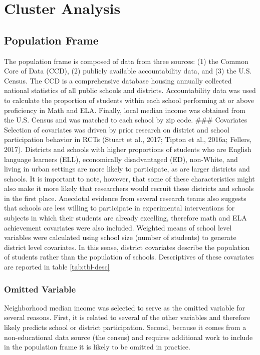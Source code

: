 \documentclass[man]{apa6}
\theoremstyle{definition}
\theoremstyle{definition}
\theoremstyle{definition}
\theoremstyle{remark}
\begin{document}
\section{Cluster Analysis}\label{cluster-analysis}

\subsection{Population Frame}\label{population-frame}

The population frame is composed of data from three sources: (1) the
Common Core of Data (CCD), (2) publicly available accountability data,
and (3) the U.S. Census. The CCD is a comprehensive database housing
annually collected national statistics of all public schools and
districts. Accountability data was used to calculate the proportion of
students within each school performing at or above proficiency in Math
and ELA. Finally, local median income was obtained from the U.S. Census
and was matched to each school by zip code. \#\#\# Covariates Selection
of covariates was driven by prior research on district and school
participation behavior in RCTs (Stuart et al., 2017; Tipton et al.,
2016a; Fellers, 2017). Districts and schools with higher proportions of
students who are English language learners (ELL), economically
disadvantaged (ED), non-White, and living in urban settings are more
likely to participate, as are larger districts and schools. It is
important to note, however, that some of these characteristics might
also make it more likely that researchers would recruit these districts
and schools in the first place. Anecdotal evidence from several research
teams also suggests that schools are less willing to participate in
experimental interventions for subjects in which their students are
already excelling, therefore math and ELA achievement covariates were
also included. Weighted means of school level variables were calculated
using school size (number of students) to generate district level
covariates. In this sense, district covariates describe the population
of students rather than the population of schools. Descriptives of these
covariates are reported in table \ref{tab:tbl-desc}

\subsubsection{Omitted Variable}\label{omitted-variable}

Neighborhood median income was selected to serve as the omitted variable
for several reasons. First, it is related to several of the other
variables and therefore likely predicts school or district
participation. Second, because it comes from a non-educational data
source (the census) and requires additional work to include in the
population frame it is likely to be omitted in practice.
\end{document}
